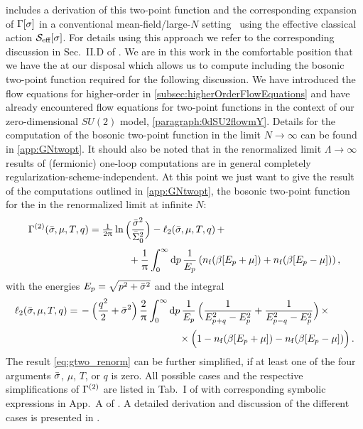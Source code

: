  includes a derivation of this two-point function and the corresponding expansion of ${\Gamma [ \sigma ]}$ in a conventional mean-field/large-$N$ setting~\cite{Carignano:2019ivp,Buballa:2020nsi,Nakano:2004cd,Buballa:2018hux} using the effective classical action $\mathcal{S}_{\text{eff}} [ \sigma ]$.
For details using this approach we refer to the corresponding discussion in Sec.~II.D of . 
We are in this work in the comfortable position that we have the \frg{} at our disposal which allows us to compute \nptFunctions{} \dash{} including the bosonic two-point function required for the following discussion.
We have introduced the flow equations for higher-order \nptFunctions{} in \cref{subsec:higherOrderFlowEquations} and have already encountered flow equations for two-point functions in the context of our zero-dimensional $SU(2)$ model, \cf{} \cref{paragraph:0dSU2flowmY}.
Details for the computation of the bosonic two-point function in the limit $N\rightarrow \infty$ can be found in \cref{app:GNtwopt}.
It should also be noted that in the renormalized limit $\Lambda\rightarrow \infty$ results of (fermionic) one-loop computations are in general completely regularization-scheme-independent.
At this point we just want to give the result of the computations outlined in \cref{app:GNtwopt}, \viz{} the bosonic two-point function for the \gnm{} in the renormalized limit at infinite $N$:
\begin{align}
	\gtwovardef &=\tfrac{1}{2\uppi} \ln \Big( \frac{\shom^2}{\snull^2} \Big)  - \ell_2 ( \shom, \mu, T, q )\,+\notag\\[.2em]
		&\qquad\qquad+\frac{1}{\uppi}\int_{0}^{\infty} \dif p \, \frac{1}{\energy{p}} \, ( \nf (\beta[\energy{p}+\mu]) + \nf(\beta[\energy{p}-\mu]) )\, ,	\label{eq:gtwo_renorm}
\end{align}
with the energies ${{E_{p} = \sqrt{p^2 + \bar{\sigma}^2}}}$ and the integral
\begin{align}
	\ell_2 ( \shom, \mu, T, q ) = \, & - \Big( \frac{q^2}{2} + \shom^2 \Big) \, \frac{2}{\uppi} \int_{0}^{\infty} \dif p \, \frac{1}{\energy{p}} \, \Big( \frac{1}{\energy{p + q}^2 - \energy{p}^2} + \frac{1}{\energy{p - q}^2 - \energy{p}^2} \Big) \, \times \notag\\[.2em] 
	&\qquad\qquad\qquad\qquad\qquad \times\Big( 1 -\nf (\beta[ \energy{p}+\mu] ) - \nf (\beta[\energy{p} - \mu] )\Big) \, .	\label{eq:ell2}
\end{align}
The result \cref{eq:gtwo_renorm} can be further simplified, if at least one of the four arguments $\bar{\sigma}$, $\mu$, $T$, or $q$ is zero.
All possible cases and the respective simplifications of $\Gamma^{(2)}$ are listed in Tab.~I of  with corresponding symbolic expressions in App.~A of .
A detailed derivation and discussion of the different cases is presented in .


